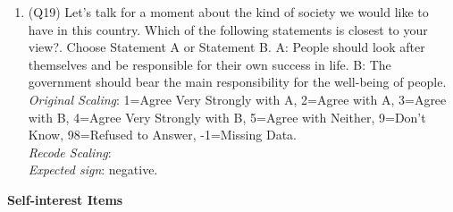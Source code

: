 \documentclass[]{article}
\begin{document}
\begin{enumerate}
  \item (Q19) Let’s talk for a moment about the kind of society we would like to have in this country. Which of the following statements is closest to your view?. Choose Statement A or Statement B. A: People should look after themselves and be responsible for their own success in life. B: The government should bear the main responsibility for the well-being of people. \\ \textit{Original Scaling}: 1=Agree Very Strongly with A, 2=Agree with A, 3=Agree with B, 4=Agree Very Strongly with B, 5=Agree with Neither, 9=Don’t Know, 98=Refused to Answer, -1=Missing Data. \\ \textit{Recode Scaling}:  \\ \textit{Expected sign}: negative.
\end{enumerate}

\textbf{Self-interest Items}
\end{document}
